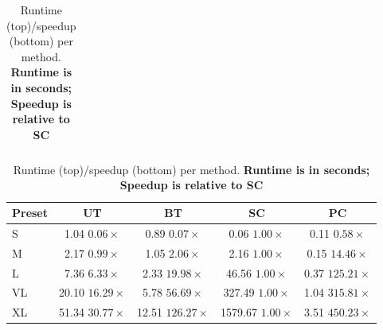 \begin{table}[h]
\begin{minipage}{0.49\textwidth}
\begin{tabular}{l c c c c}
\bottomrule
\end{tabular}
\end{minipage}
\hspace{0.001\textwidth}  %
\begin{minipage}{0.48\textwidth}
\centering
\begin{tabular}{l c c c c}
\toprule
\textbf{Preset} & \textbf{UT} & \textbf{BT} & \textbf{SC} & \textbf{PC} \\
\midrule


S  & \makecell{1.04 \\ $0.06\times$}
   & \makecell{0.89 \\ $0.07\times$}
   & \makecell{0.06 \\ $1.00\times$}
   & \makecell{0.11 \\ $0.58\times$} \\

M  & \makecell{2.17 \\ $0.99\times$}
   & \makecell{1.05 \\ $2.06\times$}
   & \makecell{2.16 \\ $1.00\times$}
   & \makecell{0.15 \\ $14.46\times$} \\

L  & \makecell{7.36 \\ $6.33\times$}
   & \makecell{2.33 \\ $19.98\times$}
   & \makecell{46.56 \\ $1.00\times$}
   & \makecell{0.37 \\ $125.21\times$} \\

VL & \makecell{20.10 \\ $16.29\times$}
   & \makecell{5.78 \\ $56.69\times$}
   & \makecell{327.49 \\ $1.00\times$}
   & \makecell{1.04 \\ $315.81\times$} \\

XL & \makecell{51.34 \\ $30.77\times$}
   & \makecell{12.51 \\ $126.27\times$}
   & \makecell{1579.67 \\ $1.00\times$}
   & \makecell{3.51 \\ $450.23\times$} \\

\bottomrule
\end{tabular}
\end{minipage}

\caption{Runtime (top)/speedup (bottom) per method. \textbf{Runtime is in seconds; Speedup is relative to SC}}
\end{table}

